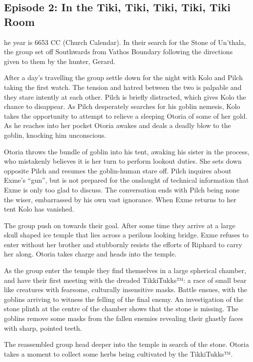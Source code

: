 \subsection{Episode 2: In the Tiki, Tiki, Tiki, Tiki, Tiki Room}

he year is 6653 CC (Church Calendar). In their search for the Stone of Un'thala, the group set off Southwards from Vathos Boundary following the directions given to them by the hunter, Gerard.\medskip

After a day’s travelling the group settle down for the night with Kolo and Pilch taking the first watch. The tension and hatred between the two is palpable and they stare intently at each other. Pilch is briefly distracted, which gives Kolo the chance to disappear. As Pilch desperately searches for his goblin nemesis, Kolo takes the opportunity to attempt to relieve a sleeping Otoria of some of her gold. As he reaches into her pocket Otoria awakes and deals a deadly blow to the goblin, knocking him unconscious.\medskip

Otoria throws the bundle of goblin into his tent, awaking his sister in the process, who mistakenly believes it is her turn to perform lookout duties. She sets down opposite Pilch and resumes the goblin-human stare off. Pilch inquires about Exme’s “gun”, but is not prepared for the onslaught of technical information that Exme is only too glad to discuss. The conversation ends with Pilch being none the wiser, embarrassed by his own vast ignorance. When Exme returns to her tent Kolo has vanished.\medskip

The group push on towards their goal. After some time they arrive at a large skull shaped ice temple that lies across a perilous looking bridge. Exme refuses to enter without her brother and stubbornly resists the efforts of Riphard to carry her along. Otoria takes charge and heads into the temple.\medskip

As the group enter the temple they find themselves in a large spherical chamber, and have their first meeting with the dreaded TikkiTukks™: a race of small bear like creatures with fearsome, culturally insensitive masks. Battle ensues, with the goblins arriving to witness the felling of the final enemy. An investigation of the stone plinth at the centre of the chamber shows that the stone is missing. The goblins remove some masks from the fallen enemies revealing their ghastly faces with sharp, pointed teeth.\medskip

The reassembled group head deeper into the temple in search of the stone. Otoria takes a moment to collect some herbs being cultivated by the TikkiTukks™.\medskip

